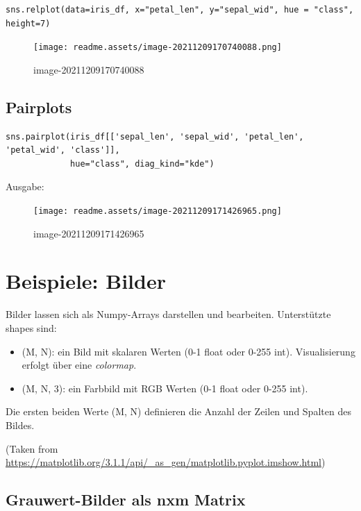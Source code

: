 \documentclass[
  oneside]{book}
\providecommand{\tightlist}{%
  \setlength{\itemsep}{0pt}\setlength{\parskip}{0pt}}
\begin{document}
\begin{verbatim}
sns.relplot(data=iris_df, x="petal_len", y="sepal_wid", hue = "class", height=7)
\end{verbatim}

\begin{figure}
\centering
\texttt{[image: readme.assets/image-20211209170740088.png]}
\caption{image-20211209170740088}
\end{figure}

\hypertarget{pairplots}{%
\section{Pairplots}\label{pairplots}}

\begin{verbatim}
sns.pairplot(iris_df[['sepal_len', 'sepal_wid', 'petal_len', 'petal_wid', 'class']],
             hue="class", diag_kind="kde")
\end{verbatim}

Ausgabe:

\begin{figure}
\centering
\texttt{[image: readme.assets/image-20211209171426965.png]}
\caption{image-20211209171426965}
\end{figure}

\hypertarget{beispiele-bilder}{%
\chapter{Beispiele: Bilder}\label{beispiele-bilder}}

Bilder lassen sich als Numpy-Arrays darstellen und bearbeiten. Unterstützte shapes sind:

\begin{itemize}
\tightlist
\item
  (M, N): ein Bild mit skalaren Werten (0-1 float oder 0-255 int). Visualisierung erfolgt über eine \emph{colormap}.
\item
  (M, N, 3): ein Farbbild mit RGB Werten (0-1 float oder 0-255 int).
\end{itemize}

Die ersten beiden Werte (M, N) definieren die Anzahl der Zeilen und Spalten des Bildes.

(Taken from \url{https://matplotlib.org/3.1.1/api/_as_gen/matplotlib.pyplot.imshow.html})

\hypertarget{grauwert-bilder-als-nxm-matrix}{%
\section{Grauwert-Bilder als nxm Matrix}\label{grauwert-bilder-als-nxm-matrix}}
\end{document}
